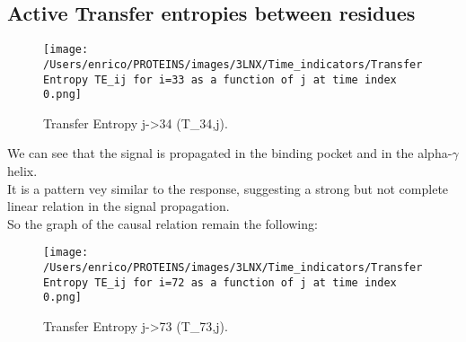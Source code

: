 \documentclass[English, Lau, oneside]{sapthesis}
\begin{document}
\subsection{Active Transfer entropies between residues}
\begin{figure}[h!]
    \centering
    \texttt{[image: /Users/enrico/PROTEINS/images/3LNX/Time\_indicators/Transfer Entropy TE\_ij for i=33 as a function of j at time index 0.png]}
    \caption{Transfer Entropy j->34 (T_{34,j}).}
    \label{fig:TE34}
\end{figure}
We can see that the signal is propagated in the binding pocket and in the alpha-$\gamma$ helix.\\
It is a pattern vey similar to the response, suggesting a strong but not complete linear relation in the signal propagation.\\
So the graph of the causal relation remain the following:\\




\begin{figure}[h!]
    \centering
    \texttt{[image: /Users/enrico/PROTEINS/images/3LNX/Time\_indicators/Transfer Entropy TE\_ij for i=72 as a function of j at time index 0.png]}
    \caption{Transfer Entropy j->73 (T_{73,j}).}
    \label{fig:TE73}
\end{figure}
\end{document}

